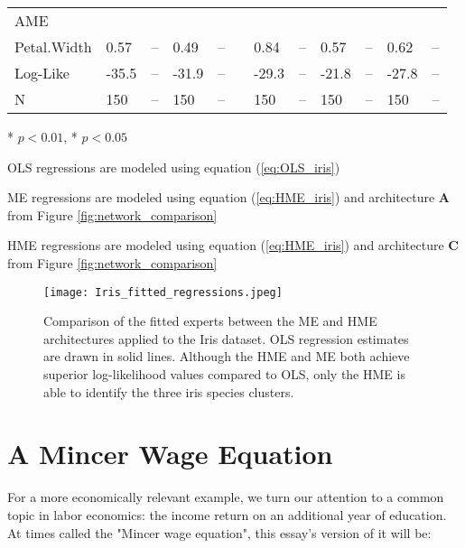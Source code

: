 \documentclass[12pt]{article}
\begin{document}
\begin{landscape}
\begin{table}
\begin{threeparttable}
\begin{tabular}[l]{l l l l l l l l l l l l}
  AME \\
  \cmidrule(r){1-1}
  Petal.Width        & 0.57 & --     & 0.49 & --     && 0.84  & --     & 0.57 & --     & 0.62 & --         \\[0.3cm]


  Log-Like           & -35.5 & --    & -31.9 & --    && -29.3  & --    & -21.8& --     & -27.8 & -- \\
  N                  & 150   & --    & 150   & --    && 150    & --    & 150  & --     & 150   & -- \\

	\hline
		\end{tabular}
		\begin{tablenotes}
			\item{\footnotesize ** $p < 0.01$, * $p < 0.05$}
			\item{\footnotesize OLS regressions are modeled using equation (\ref{eq:OLS_iris})}
			\item{\footnotesize ME regressions are modeled using equation (\ref{eq:HME_iris}) and architecture $\boldsymbol{A}$ from Figure \ref{fig:network_comparison}}
			\item{\footnotesize HME regressions are modeled using equation (\ref{eq:HME_iris}) and architecture $\boldsymbol{C}$ from Figure \ref{fig:network_comparison}}
		\end{tablenotes} \label{tbl:Iris}
	\end{threeparttable}
\end{table}
\end{landscape}


\begin{figure}[!ht]
  \texttt{[image: Iris\_fitted\_regressions.jpeg]}
  \caption{Comparison of the fitted experts between the ME and HME architectures
  applied to the Iris dataset. OLS regression estimates are drawn in solid lines.
  Although the HME and ME both achieve superior log-likelihood values compared to
  OLS, only the HME is able to identify the three iris species clusters.}
  \label{fig:Iris_fitted_regressions}
\end{figure}


\section{A Mincer Wage Equation} \label{sec:MincerWageEx}

For a more economically relevant example, we turn our attention to a common
topic in labor economics: the income return on an additional year of
education. At times called the "Mincer wage equation", this essay's version of it
will be:
\end{document}
